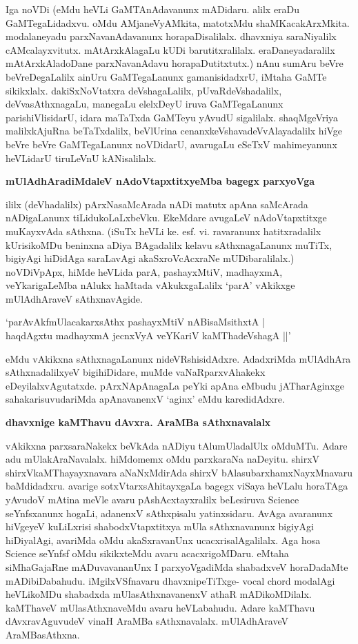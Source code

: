 Iga noVDi (eMdu heVLi GaMTAnAdavanunx mADidaru. alilx eraDu GaMTegaLidadxvu. oMdu AMjaneVyAMkita, matotxMdu shaMKacakArxMkita. modalaneyadu parxNavanAdavanunx horapaDisalilalx. dhavxniya saraNiyalilx cAMcalayxvitutx. mAtArxkAlagaLu kUDi barutitxralilalx. eraDaneyadaralilx mAtArxkAladoDane parxNavanAdavu horapaDutitxtutx.) nAnu sumAru beVre beVreDegaLalilx ainUru GaMTegaLanunx gamanisidadxrU, iMtaha GaMTe sikikxlalx. dakiSxNoVtatxra deVshagaLalilx, pUvaRdeVshadalilx, deVvasAthxnagaLu, manegaLu elelxDeyU iruva GaMTegaLanunx parishiVlisidarU, idara maTaTxda GaMTeyu yAvudU sigalilalx. shaqMgeVriya malilxkAjuRna beTaTxdalilx, beVlUrina cenanxkeVshavadeVvAlayadalilx hiVge beVre beVre GaMTegaLanunx noVDidarU, avarugaLu eSeTxV mahimeyanunx heVLidarU tiruLeVnU kANisalilalx.

\noindent
{\bf\large{mUlAdhAradiMdaleV nAdoVtapxtitxyeMba bagegx parxyoVga}}\label{page171}

ililx (deVhadalilx) pArxNasaMcArada nADi matutx apAna saMcArada nADigaLanunx tiLidukoLaLxbeVku. EkeMdare avugaLeV nAdoVtapxtitxge muKayxvAda sAthxna. (iSuTx heVLi ke. esf. vi. ravaranunx hatitxradalilx kUrisikoMDu beninxna aDiya BAgadalilx kelavu sAthxnagaLanunx muTiTx, bigiyAgi hiDidAga saraLavAgi akaSxroVcAcxraNe mUDibaralilalx.) noVDiVpApx, hiMde heVLida parA, pashayxMtiV, madhayxmA, veYkarigaLeMba nAlukx haMtada vAkukxgaLalilx `parA' vAkikxge mUlAdhAraveV sAthxnavAgide.

\begin{shloka}
`parAvAkfmUlacakarxsAthx pashayxMtiV nABisaMsithxtA |\\\label{171}
haqdAgxtu madhayxmA jecnxVyA veYKariV kaMThadeVshagA ||'
\end{shloka}

eMdu vAkikxna sAthxnagaLanunx nideVRshisidAdxre. AdadxriMda mUlAdhAra sAthxnadalilxyeV bigihiDidare, muMde vaNaRparxvAhakekx eDeyilalxvAgutatxde. pArxNApAnagaLa peYki apAna eMbudu jATharAginxge sahakarisuvudariMda apAnavanenxV `aginx' eMdu karedidAdxre.

\noindent
{\bf\large{dhavxnige kaMThavu dAvxra. AraMBa sAthxnavalalx}}\label{page171}

vAkikxna parxsaraNakekx beVkAda nADiyu tAlumUladalUlx oMduMTu. Adare adu mUlakAraNavalalx. hiMdomemx oMdu parxkaraNa naDeyitu. shirxV shirxVkaMThayayxnavara aNaNxMdirAda shirxV bAlasubarxhamxNayxMnavaru baMdidadxru. avarige sotxVtarxsAhitayxgaLa bagegx viSaya heVLalu horaTAga yAvudoV mAtina meVle avaru pAshAcxtayxralilx beLesiruva {\rm Science} seYnfsxanunx hogaLi, adanenxV sAthxpisalu yatinxsidaru. AvAga avaranunx hiVgeyeV kuLiLxrisi shabodxVtapxtitxya mUla sAthxnavanunx bigiyAgi hiDiyalAgi, avariMda oMdu akaSxravanUnx ucacxrisalAgalilalx. Aga hosa {\rm Science} seYnfsf oMdu sikikxteMdu avaru acacxrigoMDaru. eMtaha siMhaGajaRne mADuvavananUnx I parxyoVgadiMda shabadxveV horaDadaMte mADibiDabahudu. iMgilxVSfnavaru dhavxnipeTiTxge- {\rm vocal chord} modalAgi heVLikoMDu shabadxda mUlasAthxnavanenxV athaR mADikoMDilalx. kaMThaveV mUlasAthxnaveMdu avaru heVLabahudu. Adare kaMThavu dAvxravAguvudeV vinaH AraMBa sAthxnavalalx. mUlAdhAraveV AraMBasAthxna. 


